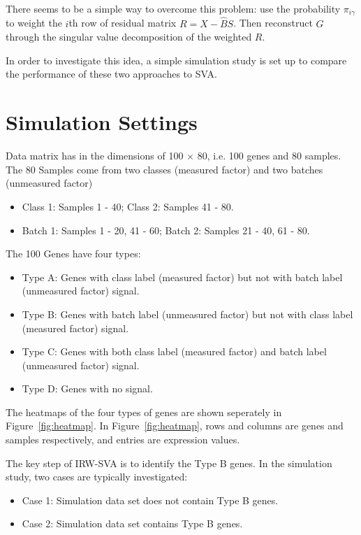 \documentclass[11pt]{article}
\begin{document}
There seems to be a simple way to overcome this problem: use the probability $\pi_{i \gamma}$ to weight the $i$th row of residual matrix $R = X - \hat{B} S$. Then reconstruct $\hat{G}$ through the singular value decomposition of the weighted $R$. 


In order to investigate this idea, a simple simulation study is set up to compare the performance of these two approaches to SVA.

\section{Simulation Settings} 

Data matrix has in the dimensions of 100 $\times$ 80, i.e. 100 genes and 80 samples. The 80 Samples come from two classes (measured factor) and two batches (unmeasured factor)
\begin{itemize} 
\item Class 1: Samples 1 - 40; Class 2: Samples 41 - 80.
\item Batch 1: Samples 1 - 20, 41 - 60; Batch 2: Samples 21 - 40, 61 - 80.
\end{itemize}
The 100 Genes have four types:
\begin{itemize}
\item Type A: Genes with class label (measured factor) but not with batch label (unmeasured factor) signal.
\item Type B: Genes with batch label (unmeasured factor) but not with class label (measured factor) signal.
\item Type C: Genes with both class label (measured factor) and batch label (unmeasured factor) signal.
\item Type D: Genes with no signal.
\end{itemize}
The heatmaps of the four types of genes are shown seperately in Figure~\ref{fig:heatmap}. In Figure~\ref{fig:heatmap}, rows and columns are genes and samples respectively, and entries are expression values. 

The key step of IRW-SVA is to identify the Type B genes. In the simulation study, two cases are typically investigated:
\begin{itemize}
\item Case 1: Simulation data set does not contain Type B genes.
\item Case 2: Simulation data set contains Type B genes.
\end{itemize}
\end{document}
